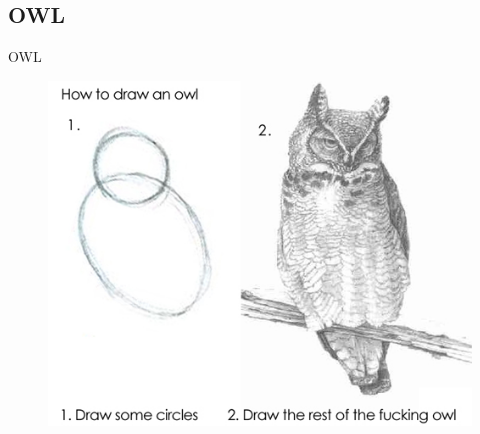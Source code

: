 \documentclass[aspectratio=169, professionalfonts, handout]{beamer}
\begin{document}
\subsection{OWL}
\begin{frame}{OWL}
	\begin{figure}
		\includegraphics[width=.6\textwidth]{figures/how-to-draw-an-owl}
	\end{figure}
\end{frame}







\end{document}
